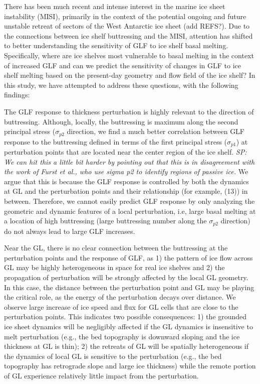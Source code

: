 \documentclass[review,oneside]{igs}
\begin{document}
There has been much recent and intense interest in the marine ice sheet instability (MISI), primarily in the context of the potential ongoing and future unstable retreat of sectors of the West Antarctic ice sheet (add REFS?). Due to the connections between ice shelf buttressing and the MISI, attention has shifted to better understanding the sensitivity of GLF to ice shelf basal melting. Specifically, where are ice shelves most vulnerable to basal melting in the context of increased GLF and can we predict the sensitivity of changes in GLF to ice shelf melting based on the present-day geometry and flow field of the ice shelf? In this study, we have attempted to address these questions, with the following findings:

The GLF response to thickness perturbation is highly relevant to the direction of buttressing. Although, locally, the buttressing is maximum along the second principal stress ($\sigma_{p2}$ direction, we find a much better correlation between GLF response to the buttressing defined in terms of the first principal stress ($\sigma_{p1}$) at perturbation points that are located near the center region of the ice shelf. \textit{SP: We can hit this a little bit harder by pointing out that this is in disagreement with the work of Furst et al., who use sigma p2 to identify regions of passive ice.} We argue that this is because the GLF response is controlled by both the dynamics at GL and the perturbation points and their relationship (for example, (13)) in between. Therefore, we cannot easily predict GLF response by only analyzing the geometric and dynamic features of a local perturbation, i.e, large basal melting at a location of high buttressing (large buttressing number along the $\sigma_{p2}$ direction) do not always lead to large GLF increases.

Near the GL, there is no clear connection between the buttressing at the perturbation points and the response of GLF, as 1) the pattern of ice flow across GL may be highly heterogeneous in space for real ice shelves and 2) the propagation of perturbation will be strongly affected by the local GL geometry. In this case, the distance between the perturbation point and GL may be playing the critical role, as the energy of the perturbation decays over distance. We observe large increase of ice speed and flux for GL cells that are close to the perturbation points. This indicates two possible consequences: 1) the grounded ice sheet dynamics will be negligibly affected if the GL dynamics is insensitive to melt perturbation (e.g., the bed topography is downward sloping and the ice thickness at GL is thin); 2) the retreats of GL will be spatially heterogeneous if the dynamics of local GL is sensitive to the perturbation (e.g., the bed topography has retrograde slope and large ice thickness) while the remote portion of GL experience relatively little impact from the perturbation.
\end{document}
